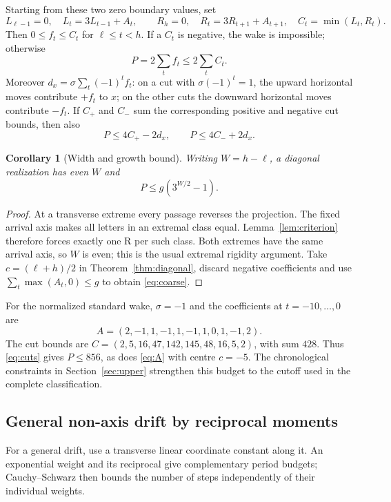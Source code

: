 \documentclass[11pt]{article}
\newtheorem{corollary}[theorem]{Corollary}
\theoremstyle{definition}\newtheorem{definition}[theorem]{Definition}
\newcommand{\R}{\mathrm R}
\begin{document}
Starting from these two zero boundary values, set
\[
 L_{\ell-1}=0,\quad L_t=3L_{t-1}+A_t,\qquad
 R_h=0,\quad R_t=3R_{t+1}+A_{t+1},\quad C_t=\min(L_t,R_t).
\]
Then $0\le f_t\le C_t$ for $\ell\le t<h$. If a $C_t$ is negative, the wake is
impossible; otherwise
\begin{equation}\label{eq:cuts}
 P=2\sum_t f_t\le2\sum_t C_t.
\end{equation}
Moreover $d_x=\sigma\sum_t(-1)^t f_t$: on a cut with $\sigma(-1)^t=1$, the
upward horizontal moves contribute $+f_t$ to $x$; on the other cuts the downward
horizontal moves contribute $-f_t$. If $C_+$ and $C_-$ sum the corresponding
positive and negative cut bounds, then also
\begin{equation}\label{eq:direction}
 P\le4C_+-2d_x,\qquad P\le4C_-+2d_x.
\end{equation}

\begin{corollary}[Width and growth bound]
Writing $W=h-\ell$, a diagonal realization has even $W$ and
\begin{equation}\label{eq:coarse}
 P\le g(3^{W/2}-1).
\end{equation}
\end{corollary}
\begin{proof}
At a transverse extreme every passage reverses the projection. The fixed arrival
axis makes all letters in an extremal class equal. Lemma~\ref{lem:criterion}
therefore forces exactly one $\R$ per such class. Both extremes have the same
arrival axis, so $W$ is even; this is the usual extremal rigidity argument.
Take $c=(\ell+h)/2$ in Theorem~\ref{thm:diagonal}, discard negative coefficients
and use $\sum_t\max(A_t,0)\le g$ to obtain \eqref{eq:coarse}.
\end{proof}

For the normalized standard wake, $\sigma=-1$ and the coefficients at
$t=-10,\ldots,0$ are
\[
 A=(2,-1,1,-1,1,-1,1,0,1,-1,2).
\]
The cut bounds are
$C=(2,5,16,47,142,145,48,16,5,2)$, with sum $428$.
Thus \eqref{eq:cuts} gives $P\le856$, as does \eqref{eq:A} with centre $c=-5$.
The chronological constraints in Section~\ref{sec:upper} strengthen this
budget to the cutoff used in the complete classification.

\subsection{General non-axis drift by reciprocal moments}
For a general drift, use a transverse linear coordinate constant along it.
An exponential weight and its reciprocal give complementary period budgets;
Cauchy--Schwarz then bounds the number of steps independently of their
individual weights.
\end{document}
